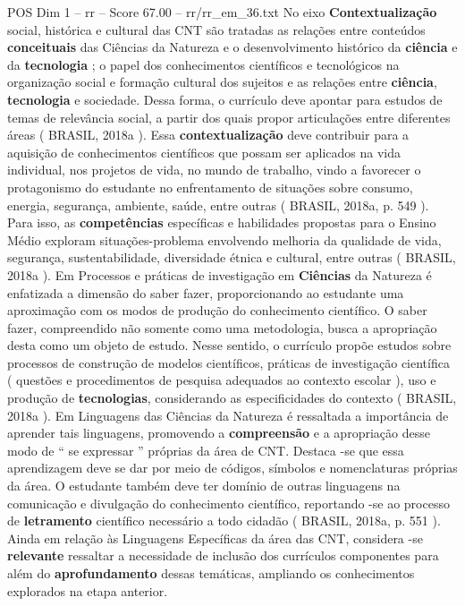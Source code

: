\begin{textsample}{POS Dim 1 – rr – Score 67.00 – rr/rr\_em\_36.txt}
No eixo \textbf{Contextualização} social, histórica e cultural das CNT são tratadas as relações entre conteúdos \textbf{conceituais} das Ciências da Natureza e o desenvolvimento histórico da \textbf{ciência} e da \textbf{tecnologia} ; o papel dos conhecimentos científicos e tecnológicos na organização social e formação cultural dos sujeitos e as relações entre \textbf{ciência}, \textbf{tecnologia} e sociedade.
Dessa forma, o currículo deve apontar para estudos de temas de relevância social, a partir dos quais propor articulações entre diferentes áreas ( BRASIL, 2018a ).
Essa \textbf{contextualização} deve contribuir para a aquisição de conhecimentos científicos que possam ser aplicados na vida individual, nos projetos de vida, no mundo de trabalho, vindo a favorecer o protagonismo do estudante no enfrentamento de situações sobre consumo, energia, segurança, ambiente, saúde, entre outras ( BRASIL, 2018a, p. 549 ).
Para isso, as \textbf{competências} específicas e habilidades propostas para o Ensino Médio exploram situações-problema envolvendo melhoria da qualidade de vida, segurança, sustentabilidade, diversidade étnica e cultural, entre outras ( BRASIL, 2018a ).
Em Processos e práticas de investigação em \textbf{Ciências} da Natureza é enfatizada a dimensão do saber fazer, proporcionando ao estudante uma aproximação com os modos de produção do conhecimento científico.
O saber fazer, compreendido não somente como uma metodologia, busca a apropriação desta como um objeto de estudo.
Nesse sentido, o currículo propõe estudos sobre processos de construção de modelos científicos, práticas de investigação científica ( questões e procedimentos de pesquisa adequados ao contexto escolar ), uso e produção de \textbf{tecnologias}, considerando as especificidades do contexto ( BRASIL, 2018a ).
Em Linguagens das Ciências da Natureza é ressaltada a importância de aprender tais linguagens, promovendo a \textbf{compreensão} e a apropriação desse modo de “ se expressar ” próprias da área de CNT.
Destaca -se que essa aprendizagem deve se dar por meio de códigos, símbolos e nomenclaturas próprias da área.
O estudante também deve ter domínio de outras linguagens na comunicação e divulgação do conhecimento científico, reportando -se ao processo de \textbf{letramento} científico necessário a todo cidadão ( BRASIL, 2018a, p. 551 ).
Ainda em relação às Linguagens Específicas da área das CNT, considera -se \textbf{relevante} ressaltar a necessidade de inclusão dos currículos componentes para além do \textbf{aprofundamento} dessas temáticas, ampliando os conhecimentos explorados na etapa anterior.

\end{textsample}
